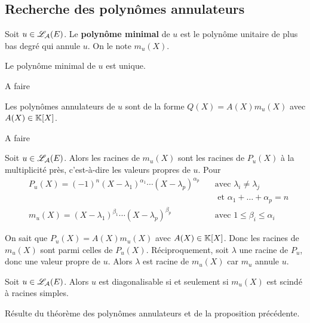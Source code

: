 \documentclass[a4paper, 12pt]{article}
\begin{document}
\subsection{Recherche des polynômes annulateurs}

\begin{definition}
    Soit $u \in \mathscr{L}_\mathcal{A}(E)$. Le \textbf{polynôme minimal} de $u$ est le polynôme unitaire
    de plus bas degré qui annule $u$. On le note $m_u(X)$.
\end{definition}

\begin{proposition}{}{}
    Le polynôme minimal de $u$ est unique.
\end{proposition}

\begin{demonstration}
    \begin{hotwarn}
        A faire
    \end{hotwarn}
\end{demonstration}

\begin{proposition}{}{}
    Les polynômes annulateurs de $u$ sont de la forme $Q(X) = A(X) m_u(X)$ avec $A(X) \in \mathbb{K}[X]$.
\end{proposition}

\begin{demonstration}
    \begin{hotwarn}
        A faire
    \end{hotwarn}
\end{demonstration}

\begin{proposition}{}{}
    Soit $u \in \mathscr{L}_\mathcal{A}(E)$. Alors les racines de $m_u(X)$ sont les racines de $P_u(X)$ à la multiplicité près, c'est-à-dire les valeurs propres de $u$.
    Pour
    \[
    \begin{aligned}
        &P_u(X) = (-1)^n (X - \lambda_1)^{\alpha_1} \cdots (X - \lambda_p)^{\alpha_p} \quad &\text{avec } \lambda_i \neq \lambda_j \\
        &&\text{ et } \alpha_1 + \ldots + \alpha_p = n \\
        &m_u(X) = (X - \lambda_1)^{\beta_1} \cdots (X - \lambda_p)^{\beta_p} \quad &\text{avec } 1 \leq \beta_i \leq \alpha_i
    \end{aligned}
    \]
\end{proposition}

\begin{demonstration}
    On sait que $P_u(X) = A(X) m_u(X)$ avec $A(X) \in \mathbb{K}[X]$. Donc les racines de $m_u(X)$ sont parmi celles de $P_u(X)$.
    \n Réciproquement, soit $\lambda$ une racine de $P_u$, donc une valeur propre de $u$. Alors $\lambda$ est racine de $m_u(X)$ car $m_u$ annule $u$.
\end{demonstration}

\begin{theoreme}{}{}
    Soit $u \in \mathscr{L}_\mathcal{A}(E)$. Alors $u$ est diagonalisable si et seulement si $m_u(X)$ est scindé à racines simples.
\end{theoreme}

\begin{demonstration}
    Résulte du théorème des polynômes annulateurs et de la proposition précédente.
\end{demonstration}
\end{document}
